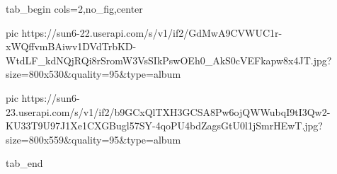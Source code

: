  
 
 
 
 

\ifcmt
  tab_begin cols=2,no_fig,center

     pic https://sun6-22.userapi.com/s/v1/if2/GdMwA9CVWUC1r-xWQffvmBAiwv1DVdTrbKD-WtdLF_kdNQjRQi8rSromW3VsSIkPswOEh0_AkS0cVEFkapw8x4JT.jpg?size=800x530&quality=95&type=album

     pic https://sun6-23.userapi.com/s/v1/if2/b9GCxQlTXH3GCSA8Pw6ojQWWubqI9tI3Qw2-KU33T9U97J1Xe1CXGBugl57SY-4qoPU4bdZagsGtU0l1jSmrHEwT.jpg?size=800x559&quality=95&type=album

  tab_end
\fi
